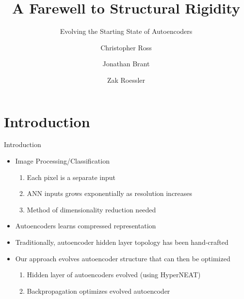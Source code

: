 \documentclass[xcolor=dvipsnames]{beamer}
\title{A Farewell to Structural Rigidity}
\subtitle{Evolving the Starting State of Autoencoders}
\author[Ross \and Brant \and Roessler]{Christopher Ross \and Jonathan Brant \and Zak Roessler}
\begin{document}
	\begin{frame}
		\titlepage
	\end{frame}
	
	\section{Introduction}
	\begin{frame}{Introduction}	
		\begin{itemize}
			\item Image Processing/Classification
			\begin{enumerate}
				\item Each pixel is a separate input
				\item ANN inputs grows exponentially as resolution increases
				\item Method of dimensionality reduction needed
			\end{enumerate}			
			\item Autoencoders learns compressed representation
			
			\item Traditionally, autoencoder hidden layer topology has been hand-crafted
			
			\item Our approach evolves autoencoder structure that can then be optimized			
			\begin{enumerate}
				\item Hidden layer of autoencoders evolved (using HyperNEAT)
				\item Backpropagation optimizes evolved autoencoder
			\end{enumerate}
		\end{itemize}
	\end{frame}
	
\end{document}
